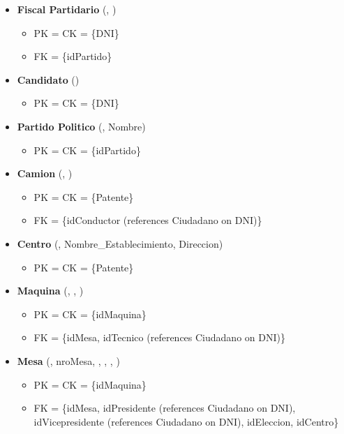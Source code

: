 \begin{itemize}
	\item \textbf{Fiscal Partidario} (, ) 
	\begin{itemize}
		\item PK = CK = \{DNI\}
		\item FK = \{idPartido\}
	\end{itemize}
	\vspace{1mm}

	\item \textbf{Candidato} () 
	\begin{itemize}
		\item PK = CK = \{DNI\}
	\end{itemize}
	\vspace{1mm}


	\item \textbf{Partido Politico} (, Nombre) 
	\begin{itemize}
		\item PK = CK = \{idPartido\}
	\end{itemize}
	\vspace{1mm}

	\item \textbf{Camion} (, ) 
	\begin{itemize}
		\item PK = CK = \{Patente\}
		\item FK = \{idConductor (references Ciudadano on DNI)\}
	\end{itemize}
	\vspace{1mm}

	\item \textbf{Centro} (, Nombre\_Establecimiento, Direccion) 
	\begin{itemize}
		\item PK = CK = \{Patente\}
	\end{itemize}
	\vspace{1mm}

	\item \textbf{Maquina} (, , ) 
	\begin{itemize}
		\item PK = CK = \{idMaquina\}
		\item FK = \{idMesa, idTecnico (references Ciudadano on DNI)\}
	\end{itemize}
	\vspace{1mm}

	\item \textbf{Mesa} (, nroMesa, , , , ) 
	\begin{itemize}
		\item PK = CK = \{idMaquina\}
		\item FK = \{idMesa, idPresidente (references Ciudadano on DNI), idVicepresidente (references Ciudadano on DNI), idEleccion, idCentro\}
	\end{itemize}
	\vspace{1mm}

\end{itemize}
		
